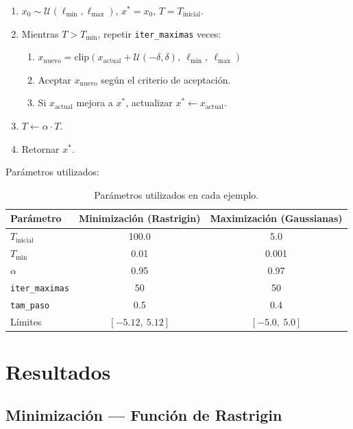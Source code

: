 \documentclass[11pt]{article}
\begin{document}
\begin{enumerate}
    \item $x_0 \sim \mathcal{U}(\ell_{\min}, \ell_{\max})$, \quad $x^* = x_0$, \quad $T = T_{\text{inicial}}$.
    \item Mientras $T > T_{\min}$, repetir \texttt{iter\_maximas} veces:
    \begin{enumerate}
        \item $x_{\text{nuevo}} = \text{clip}(x_{\text{actual}} + \mathcal{U}(-\delta,\delta),\ \ell_{\min},\ \ell_{\max})$
        \item Aceptar $x_{\text{nuevo}}$ seg\'un el criterio de aceptaci\'on.
        \item Si $x_{\text{actual}}$ mejora a $x^*$, actualizar $x^* \leftarrow x_{\text{actual}}$.
    \end{enumerate}
    \item $T \leftarrow \alpha \cdot T$.
    \item Retornar $x^*$.
\end{enumerate}

Par\'ametros utilizados:

\begin{table}[H]
\centering
\begin{tabular}{lcc}
\hline\hline
Par\'ametro & Minimizaci\'on (Rastrigin) & Maximizaci\'on (Gaussianas) \\
\hline
$T_{\text{inicial}}$ & 100.0 & 5.0 \\
$T_{\min}$           & 0.01  & 0.001 \\
$\alpha$             & 0.95  & 0.97 \\
\texttt{iter\_maximas} & 50  & 50 \\
\texttt{tam\_paso}   & 0.5   & 0.4 \\
L\'imites            & $[-5.12,\ 5.12]$ & $[-5.0,\ 5.0]$ \\
\hline\hline
\end{tabular}
\caption{Par\'ametros utilizados en cada ejemplo.}
\end{table}

\section{Resultados}

\subsection{Minimizaci\'on --- Funci\'on de Rastrigin}
\end{document}
